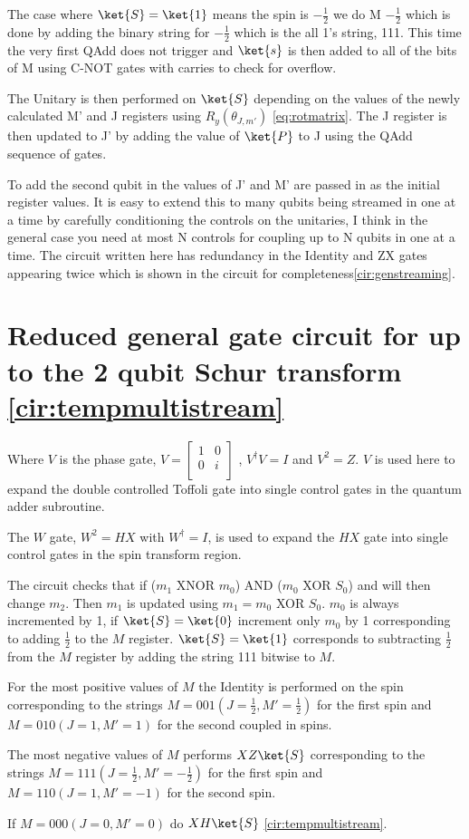 The case where $\ket{S} = \ket{1}$ means the spin is $-\frac{1}{2}$ we do M $-\frac{1}{2}$ which is done by adding the binary string for $-\frac{1}{2}$ which is the all 1's string, 111. This time the very first QAdd does not trigger and $\ket{s}$ is then added to all of the bits of M using C-NOT gates with carries to check for overflow. 

The Unitary is then performed on $\ket{S}$ depending on the values of the newly calculated M' and J registers using $R_y(\theta_{J,m'})$ \autoref{eq:rotmatrix}. The J register is then updated to J' by adding the value of $\ket{P}$ to J using the QAdd sequence of gates.

To add the second qubit in the values of J' and M' are passed in as the initial register values. It is easy to extend this to many qubits being streamed in one at a time by carefully conditioning the controls on the unitaries, I think in the general case you need at most N controls for coupling up to N qubits in one at a time. The circuit written here has redundancy in the Identity and ZX gates appearing twice which is shown in the circuit for completeness\autoref{cir:genstreaming}. 

\section{Reduced general gate circuit for up to the 2 qubit Schur transform \autoref{cir:tempmultistream}}

Where $V$ is the phase gate, 
$ V = \begin{bmatrix}
1 & 0 \\
0 & i \\
\end{bmatrix} $
, $V^{\dag}V = I$ and $V^2 = Z$. $V$ is used here to expand the double controlled Toffoli gate into single control gates in the quantum adder subroutine.

The $W$ gate, $W^2 = HX$ with $W^{\dag} = I$, is used to expand the $HX$ gate into single control gates in the spin transform region. 

The circuit checks that if ($m_1$ XNOR $m_0$) AND ($m_0$ XOR $S_0$) and will then change $m_2$. Then $m_1$ is updated using $m_1 = m_0$ XOR $S_0$. $m_0$ is always incremented by 1, if $\ket{S} = \ket{0}$ increment only $m_0$ by 1 corresponding to adding $\frac{1}{2}$ to the $M$ register. $\ket{S} = \ket{1}$ corresponds to subtracting $\frac{1}{2}$ from the $M$ register by adding the string 111 bitwise to $M$. 
 
For the most positive values of $M$ the Identity is performed on the spin corresponding to the strings $M=001 (J=\frac{1}{2}, M' = \frac{1}{2})$ for the first spin and $M=010 (J=1, M'=1) $ for the second coupled in spins. 

The most negative values of $M$ performs $XZ \ket{S}$ corresponding to the strings $M=111 (J=\frac{1}{2}, M'=-\frac{1}{2})$ for the first spin and $M=110 (J=1, M'=-1)$ for the second spin.

If $M=000 (J=0, M'=0)$ do $XH \ket{S}$ \autoref{cir:tempmultistream}.  
